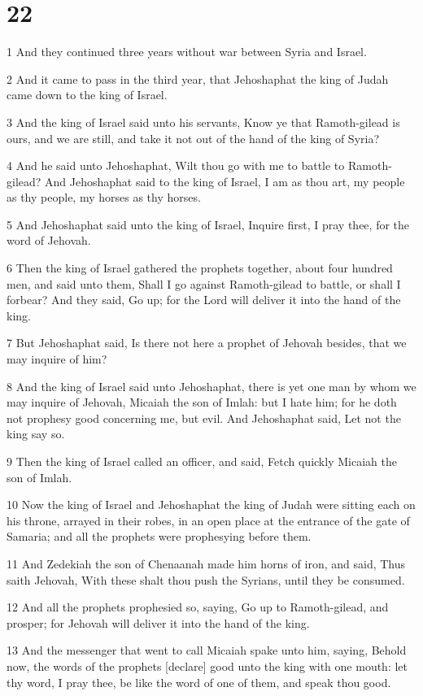 \chapter{22}

\par 1 And they continued three years without war between Syria and Israel.
\par 2 And it came to pass in the third year, that Jehoshaphat the king of Judah came down to the king of Israel.
\par 3 And the king of Israel said unto his servants, Know ye that Ramoth-gilead is ours, and we are still, and take it not out of the hand of the king of Syria?
\par 4 And he said unto Jehoshaphat, Wilt thou go with me to battle to Ramoth-gilead? And Jehoshaphat said to the king of Israel, I am as thou art, my people as thy people, my horses as thy horses.
\par 5 And Jehoshaphat said unto the king of Israel, Inquire first, I pray thee, for the word of Jehovah.
\par 6 Then the king of Israel gathered the prophets together, about four hundred men, and said unto them, Shall I go against Ramoth-gilead to battle, or shall I forbear? And they said, Go up; for the Lord will deliver it into the hand of the king.
\par 7 But Jehoshaphat said, Is there not here a prophet of Jehovah besides, that we may inquire of him?
\par 8 And the king of Israel said unto Jehoshaphat, there is yet one man by whom we may inquire of Jehovah, Micaiah the son of Imlah: but I hate him; for he doth not prophesy good concerning me, but evil. And Jehoshaphat said, Let not the king say so.
\par 9 Then the king of Israel called an officer, and said, Fetch quickly Micaiah the son of Imlah.
\par 10 Now the king of Israel and Jehoshaphat the king of Judah were sitting each on his throne, arrayed in their robes, in an open place at the entrance of the gate of Samaria; and all the prophets were prophesying before them.
\par 11 And Zedekiah the son of Chenaanah made him horns of iron, and said, Thus saith Jehovah, With these shalt thou push the Syrians, until they be consumed.
\par 12 And all the prophets prophesied so, saying, Go up to Ramoth-gilead, and prosper; for Jehovah will deliver it into the hand of the king.
\par 13 And the messenger that went to call Micaiah spake unto him, saying, Behold now, the words of the prophets [declare] good unto the king with one mouth: let thy word, I pray thee, be like the word of one of them, and speak thou good.

